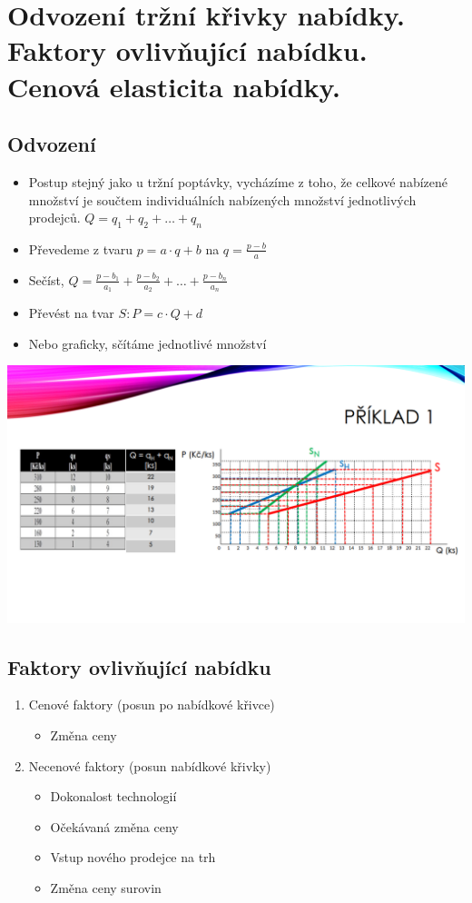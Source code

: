 \clearpage
\section{Odvození tržní křivky nabídky. Faktory ovlivňující nabídku. Cenová elasticita nabídky.}

\subsection{Odvození}
\begin{itemize}
    \item Postup stejný jako u tržní poptávky, vycházíme z toho, že celkové nabízené množství je 
    součtem individuálních nabízených množství jednotlivých prodejců. $Q=q_1+q_2+\dots +q_n$
    \item Převedeme z tvaru $p=a\cdot q+b$ na $q=\frac{p-b}{a}$
    \item Sečíst,  $Q=\frac{p-b_1}{a_1}+\frac{p-b_2}{a_2}+\dots +\frac{p-b_n}{a_n}$
    \item Převést na tvar $S:P=c\cdot Q + d$
    \item Nebo graficky, sčítáme jednotlivé množství
\end{itemize}
\includegraphics[width=16cm]{images/10_graficky.png}

\subsection{Faktory ovlivňující nabídku}
\begin{enumerate}
    \item Cenové faktory (posun po nabídkové křivce)
    \begin{itemize}
        \item Změna ceny
    \end{itemize}
    \item Necenové faktory (posun nabídkové křivky)
    \begin{itemize}
        \item Dokonalost technologií
        \item Očekávaná změna ceny
        \item Vstup nového prodejce na trh
        \item Změna ceny surovin
    \end{itemize}
\end{enumerate}

